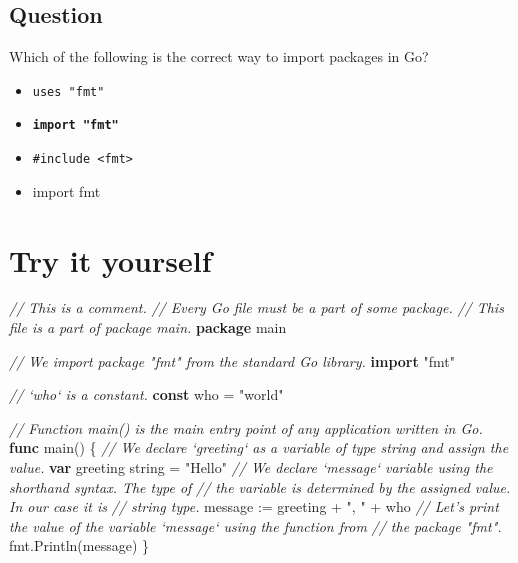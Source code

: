 \documentclass[]{book}
\newenvironment{Shaded}{\begin{snugshade}}{\end{snugshade}}
\newcommand{\CommentTok}[1]{\textcolor[rgb]{0.56,0.35,0.01}{\textit{#1}}}
\newcommand{\DataTypeTok}[1]{\textcolor[rgb]{0.13,0.29,0.53}{#1}}
\newcommand{\KeywordTok}[1]{\textcolor[rgb]{0.13,0.29,0.53}{\textbf{#1}}}
\newcommand{\NormalTok}[1]{#1}
\newcommand{\StringTok}[1]{\textcolor[rgb]{0.31,0.60,0.02}{#1}}
\providecommand{\tightlist}{%
  \setlength{\itemsep}{0pt}\setlength{\parskip}{0pt}}
\begin{document}
\hypertarget{question-18}{%
\subsection*{Question}\label{question-18}}

Which of the following is the correct way to import packages in Go?

\begin{itemize}
\tightlist
\item
  \texttt{uses\ "fmt"}
\item
  \textbf{\texttt{import\ "fmt"}}
\item
  \texttt{\#include\ \textless{}fmt\textgreater{}}
\item
  import fmt
\end{itemize}

\hypertarget{try-it-yourself}{%
\section*{Try it yourself}\label{try-it-yourself}}

\begin{Shaded}
\begin{Highlighting}[]
\CommentTok{// This is a comment.}
\CommentTok{// Every Go file must be a part of some package.}
\CommentTok{// This file is a part of package main.}
\KeywordTok{package}\NormalTok{ main}

\CommentTok{// We import package "fmt" from the standard Go library.}
\KeywordTok{import} \StringTok{"fmt"}

\CommentTok{// `who` is a constant.}
\KeywordTok{const}\NormalTok{ who = }\StringTok{"world"}

\CommentTok{// Function main() is the main entry point of any application written in Go.}
\KeywordTok{func}\NormalTok{ main() \{}
    \CommentTok{// We declare `greeting` as a variable of type string and assign the value.}
    \KeywordTok{var}\NormalTok{ greeting }\DataTypeTok{string}\NormalTok{ = }\StringTok{"Hello"}
    \CommentTok{// We declare `message` variable using the shorthand syntax. The type of}
    \CommentTok{// the variable is determined by the assigned value. In our case it is}
    \CommentTok{// string type.}
\NormalTok{    message := greeting + }\StringTok{", "}\NormalTok{ + who}
    \CommentTok{// Let's print the value of the variable `message` using the function from}
    \CommentTok{// the package "fmt".}
\NormalTok{    fmt.Println(message)}
\NormalTok{\}}
\end{Highlighting}
\end{Shaded}
\end{document}
